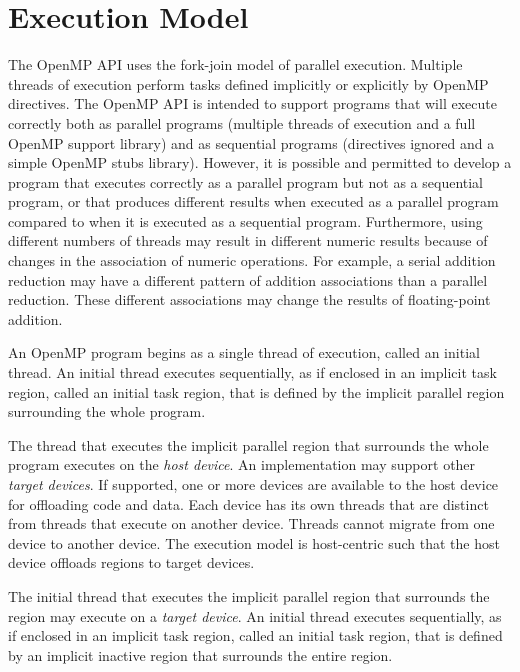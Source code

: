 \section{Execution Model}
\label{sec:Execution Model}
The OpenMP API uses the fork-join model of parallel execution. Multiple threads of
execution perform tasks defined implicitly or explicitly by OpenMP directives. The
OpenMP API is intended to support programs that will execute correctly both as parallel
programs (multiple threads of execution and a full OpenMP support library) and as
sequential programs (directives ignored and a simple OpenMP stubs library). However,
it is possible and permitted to develop a program that executes correctly as a parallel
program but not as a sequential program, or that produces different results when 
executed as a parallel program compared to when it is executed as a sequential program. 
Furthermore, using different numbers of threads may result in different numeric results 
because of changes in the association of numeric operations. For example, a serial 
addition reduction may have a different pattern of addition associations than a parallel 
reduction. These different associations may change the results of floating-point addition.

An OpenMP program begins as a single thread of execution, called an initial thread. An 
initial thread executes sequentially, as if enclosed in an implicit task region, called an 
initial task region, that is defined by the implicit parallel region surrounding the whole 
program.

The thread that executes the implicit parallel region that surrounds the whole program 
executes on the \emph{host device}. An implementation may support 
other \emph{target devices}. If
supported, one or more devices are available to the host device for offloading code and 
data. Each device has its own threads that are distinct from threads that execute on 
another device. Threads cannot migrate from one device to another device. The 
execution model is host-centric such that the host device offloads  regions to
target devices.

The initial thread that executes the implicit parallel region that surrounds the 
region may execute on a \emph{target device}. An initial thread executes sequentially, as if
enclosed in an implicit task region, called an initial task region, that is defined by an 
implicit inactive  region that surrounds the entire  region.

